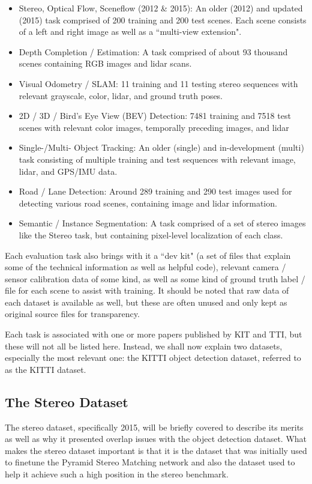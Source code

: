 \begin{itemize}\itemsep=-0.5em
    \item Stereo, Optical Flow, Sceneflow (2012 \& 2015): An older (2012) and updated (2015) task comprised of 200 training and 200 test scenes. Each scene consists of a left and right image as well as a ``multi-view extension".
    \item Depth Completion / Estimation: A task comprised of about 93 thousand scenes containing RGB images and lidar scans.
    \item Visual Odometry / SLAM: 11 training and 11 testing stereo sequences with relevant grayscale, color, lidar, and ground truth poses.
    \item 2D / 3D / Bird's Eye View (BEV) Detection: 7481 training and 7518 test scenes with relevant color images, temporally preceding images, and lidar
    \item Single-/Multi- Object Tracking: An older (single) and in-development (multi) task consisting of multiple training and test sequences with relevant image, lidar, and GPS/IMU data.
    \item Road / Lane Detection: Around 289 training and 290 test images used for detecting various road scenes, containing image and lidar information.
    \item Semantic / Instance Segmentation: A task comprised of a set of stereo images like the Stereo task, but containing pixel-level localization of each class.
\end{itemize}

Each evaluation task also brings with it a ``dev kit" (a set of files that explain some of the technical information as well as helpful code), relevant camera / sensor calibration data of some kind, as well as some kind of ground truth label / file for each scene to assist with training. It should be noted that raw data of each dataset is available as well, but these are often unused and only kept as original source files for transparency. 

Each task is associated with one or more papers published by KIT and TTI, but these will not all be listed here. Instead, we shall now explain two datasets, especially the most relevant one: the KITTI object detection dataset, referred to as the KITTI dataset.

\subsection{The Stereo Dataset}
The stereo dataset, specifically 2015, will be briefly covered to describe its merits as well as why it presented overlap issues with the object detection dataset. What makes the stereo dataset important is that it is the dataset that was initially used to finetune the Pyramid Stereo Matching network and also the dataset used to help it achieve such a high position in the stereo benchmark.

